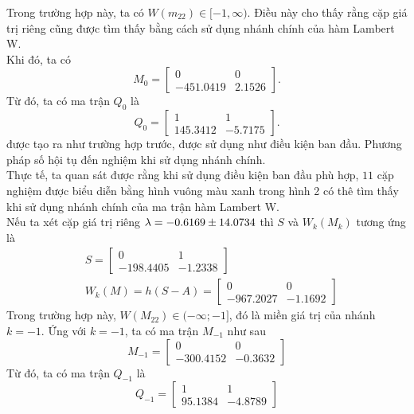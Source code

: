 Trong trường hợp này, ta có $W(m_{22}) \in [-1, \infty)$. Điều này cho thấy rằng cặp giá trị riêng cũng được tìm thấy bằng cách sử dụng nhánh chính của hàm Lambert W. \\
Khi đó, ta có 
\begin{equation*}
	M_0= \begin{bmatrix}
		0&0\\ -451.0419 &2.1526
	\end{bmatrix}.
\end{equation*}
Từ đó, ta có ma trận $Q_0$ là
\begin{equation}\label{eq39}
	Q_0= \begin{bmatrix}
		1&1\\ 145.3412 &-5.7175
	\end{bmatrix}.
\end{equation}
được tạo ra như trường hợp trước, được sử dụng như điều kiện ban đầu. Phương pháp số hội tụ đến nghiệm khi sử dụng nhánh chính.\\
Thực tế, ta quan sát được rằng khi sử dụng điều kiện ban đầu phù hợp, $11$ cặp nghiệm được biểu diễn bằng hình vuông màu xanh trong hình 2 có thê tìm thấy khi sử dụng nhánh chính của ma trận hàm Lambert W.\\
Nếu ta xét cặp giá trị riêng $\lambda = -0.6169 \pm 14.0734$ thì $S$ và $W_k(M_k)$ tương ứng là
\begin{align}\label{eq40}
	&S=\begin{bmatrix}
		0 & 1 \\ -198.4405 & -1.2338
	\end{bmatrix}
	\\ 
	& W_k(M)= h  (S -A)=\begin{bmatrix}
		0 & 0 \\ -967.2027 & -1.1692
	\end{bmatrix}
\end{align} 
Trong trường hợp này, $W(M_{22}) \in (-\infty; -1]$, đó là miền giá trị của nhánh $k = -1$. Ứng với $k = -1$, ta có ma trận $M_{-1}$ như sau
\begin{equation*}
	M_{-1}= \begin{bmatrix}
		0 & 0 \\   -300.4152  &-0.3632
	\end{bmatrix}
\end{equation*}
Từ đó, ta có ma trận $Q_{-1}$ là
\begin{equation}\label{eq41}
	Q_{-1}	= \begin{bmatrix}
		1&1\\95.1384 & -4.8789
	\end{bmatrix}
\end{equation}

